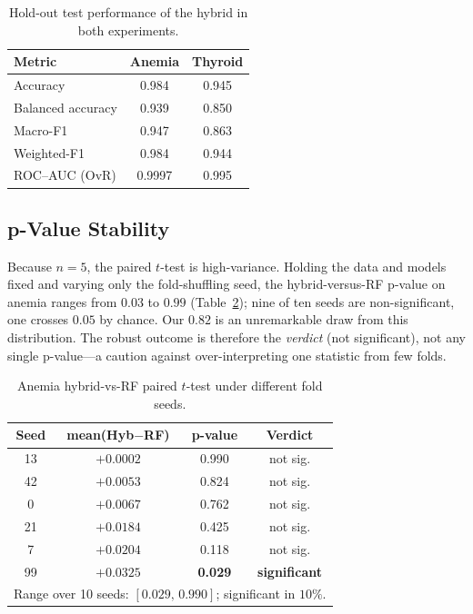 \documentclass[conference]{IEEEtran}
\begin{document}
\begin{table}[t]
\caption{Hold-out test performance of the hybrid in both experiments.}
\label{tab:test}
\centering
\renewcommand{\arraystretch}{1.2}
\begin{tabular}{lcc}
\toprule
\textbf{Metric} & \textbf{Anemia} & \textbf{Thyroid} \\
\midrule
Accuracy          & 0.984 & 0.945 \\
Balanced accuracy & 0.939 & 0.850 \\
Macro-F1          & 0.947 & 0.863 \\
Weighted-F1       & 0.984 & 0.944 \\
ROC--AUC (OvR)    & 0.9997 & 0.995 \\
\bottomrule
\end{tabular}
\end{table}

\subsection{p-Value Stability}
\label{sec:stability}
Because $n{=}5$, the paired $t$-test is high-variance. Holding the data and models
fixed and varying only the fold-shuffling seed, the hybrid-versus-RF p-value on
anemia ranges from $0.03$ to $0.99$ (Table~\ref{tab:pstab}); nine of ten seeds are
non-significant, one crosses $0.05$ by chance. Our $0.82$ is an unremarkable draw
from this distribution. The robust outcome is therefore the \emph{verdict} (not
significant), not any single p-value---a caution against over-interpreting one
statistic from few folds.

\begin{table}[t]
\caption{Anemia hybrid-vs-RF paired $t$-test under different fold seeds.}
\label{tab:pstab}
\centering
\renewcommand{\arraystretch}{1.15}
\begin{tabular}{cccc}
\toprule
\textbf{Seed} & \textbf{mean(Hyb$-$RF)} & \textbf{p-value} & \textbf{Verdict} \\
\midrule
13   & $+0.0002$ & 0.990 & not sig. \\
42   & $+0.0053$ & 0.824 & not sig. \\
0    & $+0.0067$ & 0.762 & not sig. \\
21   & $+0.0184$ & 0.425 & not sig. \\
7    & $+0.0204$ & 0.118 & not sig. \\
99   & $+0.0325$ & \textbf{0.029} & \textbf{significant} \\
\midrule
\multicolumn{4}{l}{\footnotesize Range over 10 seeds: $[0.029,\,0.990]$;
significant in $10\%$.} \\
\bottomrule
\end{tabular}
\end{table}
\end{document}
